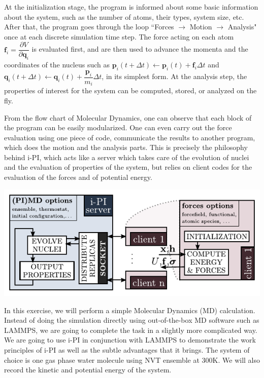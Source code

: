 \documentclass{article}
\begin{document}
\begin{Exercise}[label={basic},title={Molecular Dynamics simulations doing in a different way:  server and clients}]
At the initialization stage, the program is informed about some basic information about the system,
such as the number of atoms, their types, system size, etc.
After that, the program goes through the loop ``Forces $\rightarrow$ Motion $\rightarrow$ Analysis" once at each discrete simulation time step.
The force acting on each atom $\textbf{f}_i=\dfrac{\partial V}{\partial \textbf{q}_i}$ is evaluated first,
and are then used to advance the momenta and the coordinates of the nucleus such as
$\textbf{p}_i(t+\Delta t)\leftarrow \textbf{p}_i(t)+\textbf{f}_i \Delta t$ and 
$\textbf{q}_i(t+\Delta t)\leftarrow \textbf{q}_i(t)+\dfrac{\textbf{p}_i}{m_i} \Delta t$, 
 in its simplest form.
At the analysis step, the properties of interest for the system can be computed, stored, or analyzed on the fly.

From the flow chart of Molecular Dynamics, one can observe that each block of the program can be easily modularized.
One can even carry out the force evaluation using one piece of code,
communicate the results to another program, which does the motion and the analysis parts.
This is precisely the philosophy behind i-PI,
which acts like a server which takes care of the evolution of nuclei and the evaluation of
properties of the system, 
but relies on client codes for the evaluation
of the forces and of potential energy.

\includegraphics[width=1.0\textwidth]{ipi-scheme.pdf}

In this exercise, we will perform a simple Molecular Dynamics (MD) calculation.
Instead of doing the simulation directly using out-of-the-box MD software such as LAMMPS,
we are going to complete the task in a slightly more complicated way.
We are going to use i-PI in conjunction with LAMMPS to demonstrate the work principles of i-PI 
as well as the subtle advantages that it brings.
The system of choice is one gas phase water molecule using NVT ensemble at 300K.
We will also record the kinetic and potential energy of the system.


\end{Exercise}
\end{document}
